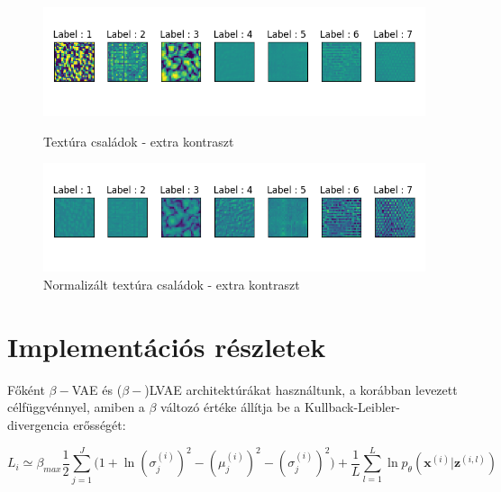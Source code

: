 \documentclass[12pt, english]{article}
\begin{document}
\begin{figure}[H]
  
  \begin{minipage}{0.48\linewidth}
    \centering
    \includegraphics[width=.95\linewidth]{default_contrast.png} 
    \caption{Textúra családok - extra kontraszt} 
  \end{minipage}%
  \begin{minipage}{0.48\linewidth}
    \centering
    \includegraphics[width=.95\linewidth]{normalized_contrast.png} 
    \caption{Normalizált textúra családok - extra kontraszt} 
  \end{minipage} 
\end{figure}

\newpage

\section{Implementációs részletek}

\vspace{7mm}

\par Főként $\beta-$VAE és ($\beta-$)LVAE architektúrákat használtunk, a korábban levezett célfüggvénnyel, amiben a $\beta$ változó értéke állítja be a Kullback-Leibler-divergencia erősségét:

\vspace{4mm}

\begin{equation}
    L_{i} \simeq \beta_{max}\frac{1}{2}\sum_{j = 1}^{J}\Big( 1 + \ln(\sigma^{(i)}_{j})^{2} - (\mu^{(i)}_{j})^{2} - (\sigma^{(i)}_{j})^{2} \Big) + \frac{1}{L}\sum_{l=1}^{L}\ln p_{\theta}(\bm{x}^{(i)} | \bm{z}^{(i, l)})
\end{equation}

\vspace{5mm}
\end{document}

